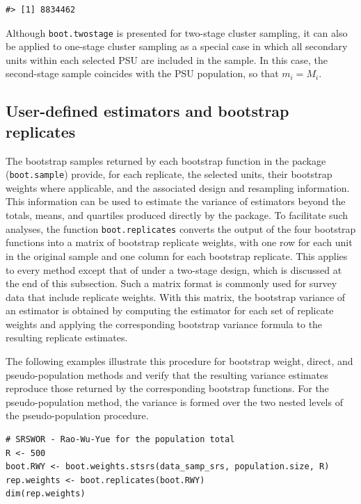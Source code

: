 \begin{verbatim}
#> [1] 8834462
\end{verbatim}

Although \texttt{boot.twostage} is presented for two-stage cluster sampling, it can also be applied to one-stage cluster sampling as a special case in which all secondary units within each selected PSU are included in the sample. In this case, the second-stage sample coincides with the PSU population, so that \(m_i = M_i\).

\subsection{User-defined estimators and bootstrap replicates}\label{sec:userdefined}

The bootstrap samples returned by each bootstrap function in the package (\texttt{boot.sample}) provide, for each replicate, the selected units, their bootstrap weights where applicable, and the associated design and resampling information. This information can be used to estimate the variance of estimators beyond the totals, means, and quartiles produced directly by the package. To facilitate such analyses, the function \texttt{boot.replicates} converts the output of the four bootstrap functions into a matrix of bootstrap replicate weights, with one row for each unit in the original sample and one column for each bootstrap replicate. This applies to every method except that of \citet{Rao:Wu:1988} under a two-stage design, which is discussed at the end of this subsection. Such a matrix format is commonly used for survey data that include replicate weights. With this matrix, the bootstrap variance of an estimator is obtained by computing the estimator for each set of replicate weights and applying the corresponding bootstrap variance formula to the resulting replicate estimates.

The following examples illustrate this procedure for bootstrap weight, direct, and pseudo-population methods and verify that the resulting variance estimates reproduce those returned by the corresponding bootstrap functions. For the pseudo-population method, the variance is formed over the two nested levels of the pseudo-population procedure.

\begin{verbatim}
# SRSWOR - Rao-Wu-Yue for the population total
R <- 500
boot.RWY <- boot.weights.stsrs(data_samp_srs, population.size, R)
rep.weights <- boot.replicates(boot.RWY)
dim(rep.weights)
\end{verbatim}

